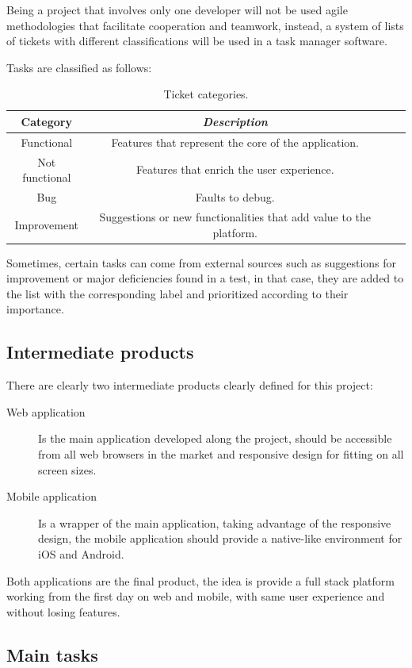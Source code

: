 \documentclass{DeustoFDP}
\begin{document}
Being a project that involves only one developer will not be used agile methodologies that facilitate cooperation and teamwork, instead, a system of lists of tickets with different classifications will be used in a task manager software.

Tasks are classified as follows:
\begin{table}[H]
	\centering
	\caption{Ticket categories.}\label{tab:ticketcategories}
	\begin{tabular}{cccc}
		\toprule
		\textbf{Category} & \emph{Description}\\
		\midrule
		Functional  & Features that represent the core of the application.\\
		Not functional   & Features that enrich the user experience.\\
		Bug & Faults to debug.\\
		Improvement & Suggestions or new functionalities that add value to the platform.\\
		\bottomrule
	\end{tabular}
\end{table}

Sometimes, certain tasks can come from external sources such as suggestions for improvement or major deficiencies found in a test, in that case, they are added to the list with the corresponding label and prioritized according to their importance.
\subsection{Intermediate products}
There are clearly two intermediate products clearly defined for this project:

\begin{description}
	\item[Web application] Is the main application developed along the project, should be accessible from all web browsers in the market and responsive design for fitting on all screen sizes. 
	\item[Mobile application] Is a wrapper of the main application, taking advantage of the responsive design, the mobile application should provide a native-like environment for iOS and Android.
\end{description}

Both applications are the final product, the idea is provide a full stack platform working from the first day on web and mobile, with same user experience and without losing features. 

\subsection{Main tasks}
\end{document}
